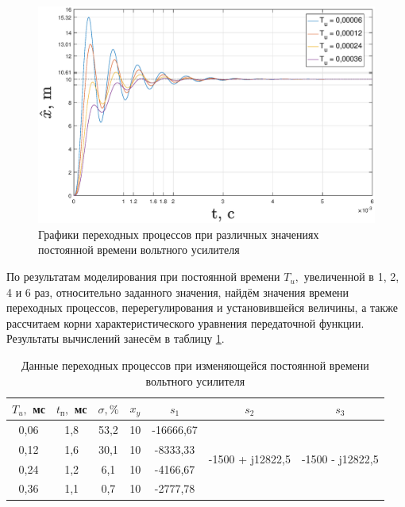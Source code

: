 \documentclass[fleqn, a4paper, 11pt, russian]{article}
\begin{document}
	\begin{figure}[ht!]
		\includegraphics[width = \textwidth]{tvar/tvarX}
		\caption{Графики переходных процессов при различных значениях постоянной времени вольтного усилителя}
		\label{tvarGraph}
	\end{figure}
	\newpage
	По результатам моделирования при постоянной времени $T_u,$ увеличенной в 1, 2, 4 и 6 раз, относительно заданного значения, найдём значения времени переходных процессов, перерегулирования и установившейся величины, а также рассчитаем корни характеристического уравнения передаточной функции. Результаты вычислений занесём в таблицу \ref{tvarTab}.
	\begin{table}[ht!]
		\centering
		\begin{threeparttable}
			\caption{Данные переходных процессов при изменяющейся постоянной времени вольтного усилителя}
			\begin{tabular}{|c|c|c|c|c|c|c|}
				\hline
				$T_u,$ мс	& $t_\text{п},$ мс	& $\sigma, \%$	& $x_y$	& $s_1$		& $s_2$								& $s_3$								\\\hline
				0,06		& 1,8				& 53,2			& 10	& -16666,67	& \multirow{4}{*}{-1500 + j12822,5}	& \multirow{4}{*}{-1500 - j12822,5} \\\cline{1-5}
				0,12		& 1,6				& 30,1			& 10	& -8333,33	&	& 	\\\cline{1-5}
				0,24		& 1,2				& 6,1			& 10	& -4166,67	& 	&	\\\cline{1-5}
				0,36		& 1,1				& 0,7			& 10	& -2777,78	&	&	\\\hline
			\end{tabular}
			\label{tvarTab}
		\end{threeparttable}
	\end{table}
	
\end{document}
